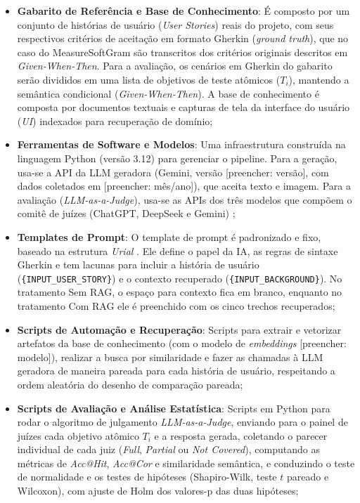 \begin{itemize}
    \item \textbf{Gabarito de Referência e Base de Conhecimento}: É composto por um conjunto de histórias de usuário (\textit{User Stories}) reais do projeto, com seus respectivos critérios de aceitação em formato Gherkin (\textit{ground truth}), que no caso do MeasureSoftGram são transcritos dos critérios originais descritos em \textit{Given-When-Then}. Para a avaliação, os cenários em Gherkin do gabarito serão divididos em uma lista de objetivos de teste atômicos ($T_i$), mantendo a semântica condicional (\textit{Given-When-Then}). A base de conhecimento é composta por documentos textuais e capturas de tela da interface do usuário (\textit{UI}) indexados para recuperação de domínio;
    
    \item \textbf{Ferramentas de Software e Modelos}: Uma infraestrutura construída na linguagem Python (versão 3.12) para gerenciar o pipeline. Para a geração, usa-se a API da LLM geradora (Gemini, versão [preencher: versão], com dados coletados em [preencher: mês/ano]),  que aceita texto e imagem. Para a avaliação (\textit{LLM-as-a-Judge}), usa-se as APIs dos três modelos que compõem o comitê de juízes (ChatGPT, DeepSeek e Gemini) \cite{wang2025};

    \item \textbf{Templates de Prompt}: O template de prompt é padronizado e fixo, baseado na estrutura \textit{Urial} \cite{wang2025}. Ele define o papel da IA, as regras de sintaxe Gherkin e tem lacunas para incluir a história de usuário (\texttt{\{INPUT\_USER\_STORY\}}) e o contexto recuperado (\texttt{\{INPUT\_BACKGROUND\}}). No tratamento Sem RAG, o espaço para contexto fica em branco, enquanto no tratamento Com RAG ele é preenchido com os cinco trechos recuperados;

    \item \textbf{Scripts de Automação e Recuperação}: Scripts para extrair e vetorizar artefatos da base de conhecimento (com o modelo de \textit{embeddings} [preencher: modelo]), realizar a busca por similaridade e fazer as chamadas à LLM geradora de maneira pareada para cada história de usuário, respeitando a ordem aleatória do desenho de comparação pareada;

    \item \textbf{Scripts de Avaliação e Análise Estatística}: Scripts em Python para rodar o algoritmo de julgamento \textit{LLM-as-a-Judge}, enviando para o painel de juízes cada objetivo atômico $T_i$ e a resposta gerada, coletando o parecer individual de cada juiz (\textit{Full}, \textit{Partial} ou \textit{Not Covered}), computando as métricas de \textit{Acc@Hit}, \textit{Acc@Cor} e similaridade semântica, e conduzindo o teste de normalidade e os testes de hipóteses (Shapiro-Wilk, teste $t$ pareado e Wilcoxon), com ajuste de Holm dos valores-p das duas hipóteses;
    


\end{itemize}
